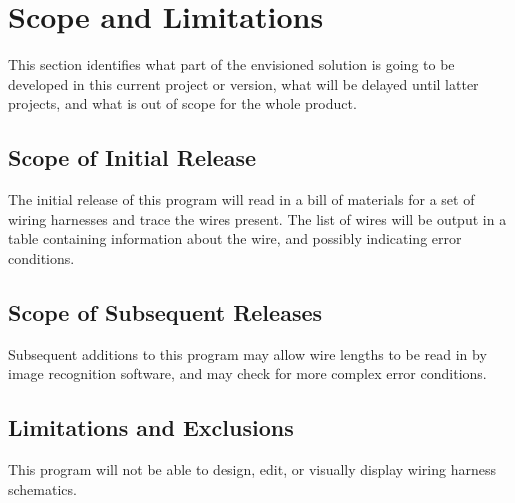 \section{Scope and Limitations}
This section identifies what part of the envisioned solution is going to be
developed in this current project or version, what will be delayed until
latter projects, and what is out of scope for the whole product.  

\subsection{Scope of Initial Release}
The initial release of this program will read in a bill of materials for a set of wiring harnesses and trace the wires present.
The list of wires will be output in a table containing information about the wire, and possibly indicating error conditions.

\subsection{Scope of Subsequent Releases}
Subsequent additions to this program may allow wire lengths to be read in by image recognition software, and may check
for more complex error conditions.

\subsection{Limitations and Exclusions}
This program will not be able to design, edit, or visually display wiring harness schematics.